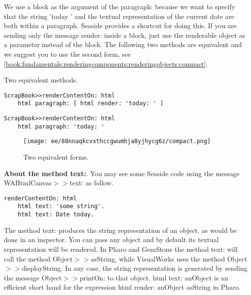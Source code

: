 \documentclass[a4paper,10pt,twoside]{book}
\newcommand{\ct}[1]{{\small\ttfamily\textup{#1}}}
\begin{document}
We use a block as the argument of the \ct{paragraph:} because we want to specify that the string \ct{'today '} and the textual representation of the current date are both within a paragraph. Seaside provides a shortcut for doing this. If you are sending only the message \ct{render:} inside a block, just use the renderable object as a parameter instead of the block. The following two methods are equivalent and we suggest you to use the second form, see \autoref{book:fundamentals:renderingcomponents:renderingobjects:compact}.

Two equivalent methods.

\begin{lstlisting}
ScrapBook>>renderContentOn: html
    html paragraph: [ html render: 'today: ' ]
\end{lstlisting}

\begin{lstlisting}
ScrapBook>>renderContentOn: html
    html paragraph: 'today: '
\end{lstlisting}

\begin{figure}[h!tbp]
	\begin{center}
		\texttt{[image: ee/88nnaqkcvxthccgwumhja8yjhycg6z/compact.png]}
		\caption{Two equivalent forms.\label{book:fundamentals:renderingcomponents:renderingobjects:compact}}
	\end{center}
\end{figure}


\textbf{About the method \ct{text:}}. You may see some Seaside code using the message  \ct{WAHtmlCanvas$>$$>$text:} as follow.

\begin{lstlisting}
renderContentOn: html
    html text: 'some string'.
    html text: Date today.
\end{lstlisting}

The method \ct{text:} produces the string representation of an object, as would be done in an inspector. You can pass any object and by default its textual representation will be rendered. In Pharo and GemStone the method \ct{text:} will call the method  \ct{Object$>$$>$asString}, while  VisualWorks uses the method  \ct{Object$>$$>$displayString}. In any case, the string representation is generated by sending the message  \ct{Object$>$$>$printOn:} to that object. \ct{html text: anObject} is an efficient short hand for the expression \ct{html render: anObject asString} in Pharo.
\end{document}

